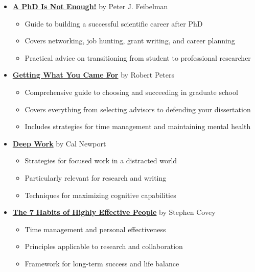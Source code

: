 \documentclass[11pt,a4paper]{article}
\begin{document}
\begin{itemize}
    \item \textbf{\href{https://www.amazon.com/PhD-Not-Enough-Survival-Science/dp/0465022227}{A PhD Is Not Enough!}} by Peter J. Feibelman
    \begin{itemize}
        \item Guide to building a successful scientific career after PhD
        \item Covers networking, job hunting, grant writing, and career planning
        \item Practical advice on transitioning from student to professional researcher
    \end{itemize}
    
    \item \textbf{\href{https://www.amazon.com/Getting-What-You-Came-For/dp/0374524777}{Getting What You Came For}} by Robert Peters
    \begin{itemize}
        \item Comprehensive guide to choosing and succeeding in graduate school
        \item Covers everything from selecting advisors to defending your dissertation
        \item Includes strategies for time management and maintaining mental health
    \end{itemize}
    
    \item \textbf{\href{https://www.amazon.com/Deep-Work-Focused-Success-Distracted/dp/1455586692}{Deep Work}} by Cal Newport
    \begin{itemize}
        \item Strategies for focused work in a distracted world
        \item Particularly relevant for research and writing
        \item Techniques for maximizing cognitive capabilities
    \end{itemize}
    
    \item \textbf{\href{https://www.amazon.com/Habits-Highly-Effective-People-Powerful/dp/1982137274}{The 7 Habits of Highly Effective People}} by Stephen Covey
    \begin{itemize}
        \item Time management and personal effectiveness
        \item Principles applicable to research and collaboration
        \item Framework for long-term success and life balance
    \end{itemize}
\end{itemize}
\end{document}
